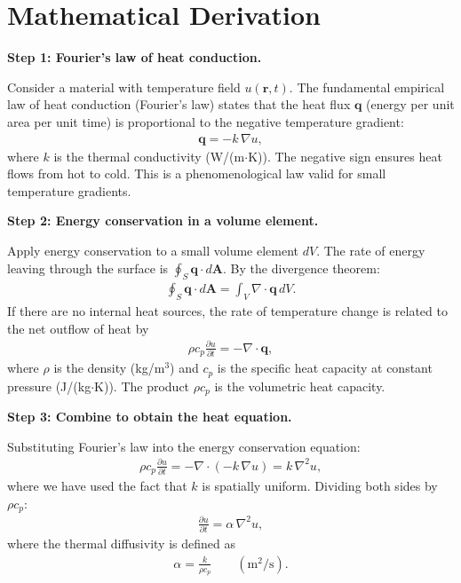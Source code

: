 \documentclass[11pt,openright]{book}
\begin{document}
\section*{Mathematical Derivation}

\textbf{Step 1: Fourier's law of heat conduction.}

Consider a material with temperature field $u(\mathbf{r}, t)$. The fundamental empirical law of heat conduction (Fourier's law) states that the heat flux $\mathbf{q}$ (energy per unit area per unit time) is proportional to the negative temperature gradient:
\begin{align}
\mathbf{q} = -k\,\nabla u,
\end{align}
where $k$ is the thermal conductivity (W/(m$\cdot$K)). The negative sign ensures heat flows from hot to cold. This is a phenomenological law valid for small temperature gradients.

\textbf{Step 2: Energy conservation in a volume element.}

Apply energy conservation to a small volume element $dV$. The rate of energy leaving through the surface is $\oint_S \mathbf{q}\cdot d\mathbf{A}$. By the divergence theorem:
\begin{align}
\oint_S \mathbf{q}\cdot d\mathbf{A} = \int_V \nabla\cdot\mathbf{q}\,dV.
\end{align}
If there are no internal heat sources, the rate of temperature change is related to the net outflow of heat by
\begin{align}
\rho c_p \frac{\partial u}{\partial t} = -\nabla\cdot\mathbf{q},
\end{align}
where $\rho$ is the density (kg/m$^3$) and $c_p$ is the specific heat capacity at constant pressure (J/(kg$\cdot$K)). The product $\rho c_p$ is the volumetric heat capacity.

\textbf{Step 3: Combine to obtain the heat equation.}

Substituting Fourier's law into the energy conservation equation:
\begin{align}
\rho c_p\frac{\partial u}{\partial t} = -\nabla\cdot(-k\,\nabla u) = k\,\nabla^2 u,
\end{align}
where we have used the fact that $k$ is spatially uniform. Dividing both sides by $\rho c_p$:
\begin{align}
\boxed{\frac{\partial u}{\partial t} = \alpha\,\nabla^2 u,}
\end{align}
where the thermal diffusivity is defined as
\begin{align}
\alpha = \frac{k}{\rho c_p} \qquad (\text{m}^2/\text{s}).
\end{align}
\end{document}
